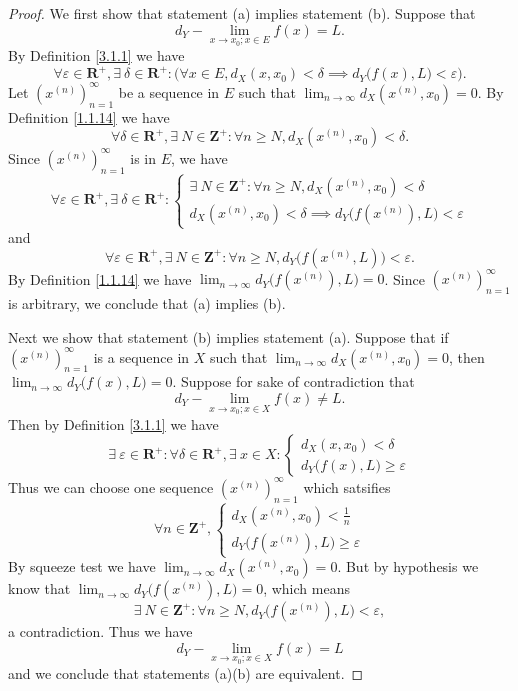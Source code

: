 \begin{proof}
    We first show that statement (a) implies statement (b).
    Suppose that
    \[
        d_Y - \lim_{x \to x_0 ; x \in E} f(x) = L.
    \]
    By Definition \ref{3.1.1} we have
    \[
        \forall \varepsilon \in \mathbf{R}^+, \exists\ \delta \in \mathbf{R}^+ : \Big(\forall x \in E, d_X(x, x_0) < \delta \implies d_Y\big(f(x), L\big) < \varepsilon\Big).
    \]
    Let \((x^{(n)})_{n = 1}^\infty\) be a sequence in \(E\) such that \(\lim_{n \to \infty} d_X(x^{(n)}, x_0) = 0\).
    By Definition \ref{1.1.14} we have
    \[
        \forall \delta \in \mathbf{R}^+, \exists\ N \in \mathbf{Z}^+ : \forall n \geq N, d_X(x^{(n)}, x_0) < \delta.
    \]
    Since \((x^{(n)})_{n = 1}^\infty\) is in \(E\), we have
    \[
        \forall \varepsilon \in \mathbf{R}^+, \exists\ \delta \in \mathbf{R}^+ : \begin{cases}
            \exists\ N \in \mathbf{Z}^+ : \forall n \geq N, d_X(x^{(n)}, x_0) < \delta \\
            d_X(x^{(n)}, x_0) < \delta \implies d_Y\big(f(x^{(n)}), L\big) < \varepsilon
        \end{cases}
    \]
    and
    \[
        \forall \varepsilon \in \mathbf{R}^+, \exists\ N \in \mathbf{Z}^+ : \forall n \geq N, d_Y\big(f(x^{(n)}, L)\big) < \varepsilon.
    \]
    By Definition \ref{1.1.14} we have \(\lim_{n \to \infty} d_Y\big(f(x^{(n)}), L\big) = 0\).
    Since \((x^{(n)})_{n = 1}^\infty\) is arbitrary, we conclude that (a) implies (b).

    Next we show that statement (b) implies statement (a).
    Suppose that if \((x^{(n)})_{n = 1}^\infty\) is a sequence in \(X\) such that \(\lim_{n \to \infty} d_X(x^{(n)}, x_0) = 0\), then \(\lim_{n \to \infty} d_Y\big(f(x), L\big) = 0\).
    Suppose for sake of contradiction that
    \[
        d_Y - \lim_{x \to x_0 ; x \in X} f(x) \neq L.
    \]
    Then by Definition \ref{3.1.1} we have
    \[
        \exists\ \varepsilon \in \mathbf{R}^+ : \forall \delta \in \mathbf{R}^+, \exists\ x \in X : \begin{cases}
            d_X(x, x_0) < \delta \\
            d_Y\big(f(x), L\big) \geq \varepsilon
        \end{cases}
    \]
    Thus we can choose one sequence \((x^{(n)})_{n = 1}^\infty\) which satsifies
    \[
        \forall n \in \mathbf{Z}^+, \begin{cases}
            d_X(x^{(n)}, x_0) < \frac{1}{n} \\
            d_Y\big(f(x^{(n)}), L\big) \geq \varepsilon
        \end{cases}
    \]
    By squeeze test we have \(\lim_{n \to \infty} d_X(x^{(n)}, x_0) = 0\).
    But by hypothesis we know that \(\lim_{n \to \infty} d_Y\big(f(x^{(n)}), L\big) = 0\), which means
    \[
        \exists\ N \in \mathbf{Z}^+ : \forall n \geq N, d_Y\big(f(x^{(n)}), L\big) < \varepsilon,
    \]
    a contradiction.
    Thus we have
    \[
        d_Y - \lim_{x \to x_0 ; x \in X} f(x) = L
    \]
    and we conclude that statements (a)(b) are equivalent.


\end{proof}
